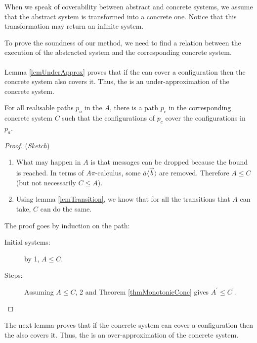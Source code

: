 \documentclass[a4paper]{report}
\numberwithin{algorithm}{chapter}
\begin{document}
\begin{rem}
When we speak of coverability between abstract and concrete systems, we assume that the abstract system is transformed into a concrete one.
Notice that this transformation may return an infinite system.
\end{rem}

To prove the soundness of our method, we need to find a relation between the execution of the abstracted system and the corresponding concrete system.

\paragraph{}
Lemma \ref{lemUnderApprox} proves that if the \dabs{} can cover a configuration then the concrete system also covers it.
Thus, the \dabs{} is an under-approximation of the concrete system.

\begin{lem}
\label{lemUnderApprox}
For all realisable paths $p_a$ in the \dabs{} $A$, there is a path $p_c$ in the corresponding concrete system $C$ such that the configurations of $p_c$ cover the configurations in $p_a$.
\end{lem}
\begin{proof} (\emph{Sketch})
\begin{enumerate}
\item
What may happen in $A$ is that messages can be dropped because the bound is reached.
In terms of $A\pi$-calculus, some $\overline a \langle \vec{b} \rangle$ are removed.
Therefore $A \leq C$ (but not necessarily $C \leq A$).

\item Using lemma \ref{lemTransition}, we know that for all the transitions that $A$ can take, $C$ can do the same.

\end{enumerate}

\noindent
The proof goes by induction on the path:
\begin{description}
\item[Initial systems:] by 1, $A \leq C$.
\item[Steps:] Assuming $A \leq C$, 2 and Theorem \ref{thmMonotonicConc} gives $A^\prime \leq C^\prime$.
\end{description}

\end{proof}

The next lemma proves that if the concrete system can cover a configuration then the \iabs{} also covers it.
Thus, the \iabs{} is an over-approximation of the concrete system.
\end{document}
